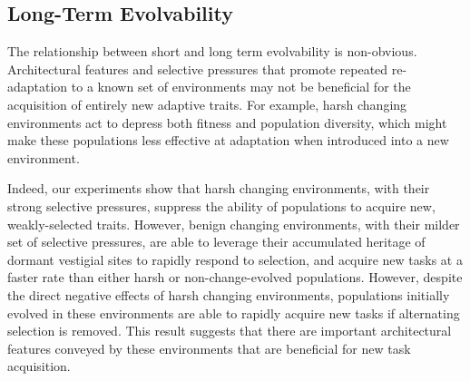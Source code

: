 \documentclass[10pt,letterpaper]{article}
\begin{document}


\subsection*{Long-Term Evolvability}
The relationship between short and long term evolvability is non-obvious. Architectural features and selective pressures that promote repeated re-adaptation to a known set of environments may not be beneficial for the acquisition of entirely new adaptive traits. For example, harsh changing environments act to depress both fitness and population diversity, which might make these populations less effective at adaptation when introduced into a new environment.

Indeed, our experiments show that harsh changing environments, with their strong selective pressures, suppress the ability of populations to acquire new, weakly-selected traits. However, benign changing environments, with their milder set of selective pressures, are able to leverage their accumulated heritage of dormant vestigial sites to rapidly respond to selection, and acquire new tasks at a faster rate than either harsh or non-change-evolved populations. However, despite the direct negative effects of harsh changing environments, populations initially evolved in these environments are able to rapidly acquire new tasks if alternating selection is removed. This result suggests that there are important architectural features conveyed by these environments that are beneficial for new task acquisition.
\end{document}
